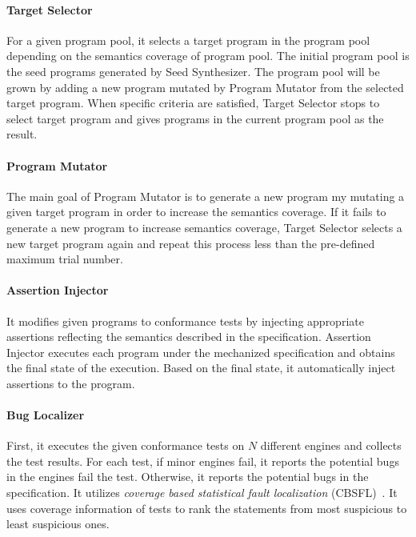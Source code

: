 \paragraph{Target Selector}
For a given program pool, it selects a target program in the program pool
depending on the semantics coverage of program pool.  The initial program pool
is the seed programs generated by \textsf{Seed Synthesizer}. The program pool
will be grown by adding a new program mutated by \textsf{Program Mutator} from
the selected target program.  When specific criteria are satisfied,
\textsf{Target Selector} stops to select target program and gives programs in
the current program pool as the result.

\paragraph{Program Mutator}
The main goal of \textsf{Program Mutator} is to generate a new program my
mutating a given target program in order to increase the semantics coverage.
If it fails to generate a new program to increase semantics coverage,
\textsf{Target Selector} selects a new target program again and repeat this
process less than the pre-defined maximum trial number.

\paragraph{Assertion Injector}
It modifies given programs to conformance tests by injecting appropriate
assertions reflecting the semantics described in the specification.
\textsf{Assertion Injector} executes each program under the mechanized
specification and obtains the final state of the execution.  Based on the final
state, it automatically inject assertions to the program.

\paragraph{Bug Localizer}
First, it executes the given conformance tests on $N$ different engines and
collects the test results.  For each test, if minor engines fail,
it reports the potential bugs in the engines fail the test.  Otherwise, it
reports the potential bugs in the specification.  It utilizes \textit{coverage
based statistical fault localization} (CBSFL)~\cite{fault-local}.  It uses coverage
information of tests to rank the statements from most suspicious to least
suspicious ones.

